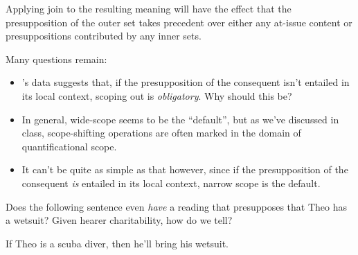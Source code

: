 \documentclass[nols,twoside,nofonts,nobib,nohyper]{tufte-handout}
\begin{document}
Applying join to the resulting meaning will have the effect that the presupposition of the outer set takes precedent over either any at-issue content or presuppositions contributed by any inner sets.

Many questions remain:

\begin{itemize}

  \item \citeauthor{mandelkern2016}'s data suggests that, if the presupposition of the consequent isn't entailed in its local context, scoping out is \textit{obligatory}. Why should this be?

  \item In general, wide-scope seems to be the \enquote{default}, but as we've discussed in class, scope-shifting operations are often marked in the domain of quantificational scope.

  \item It can't be quite as simple as that however, since if the presupposition of the consequent \textit{is} entailed in its local context, narrow scope is the default.

\end{itemize}

Does the following sentence even \textit{have} a reading that presupposes that Theo has a wetsuit? Given hearer charitability, how do we tell?

\ex
If Theo is a scuba diver, then he'll bring his wetsuit.
\xe

\printbibliography
\end{document}
